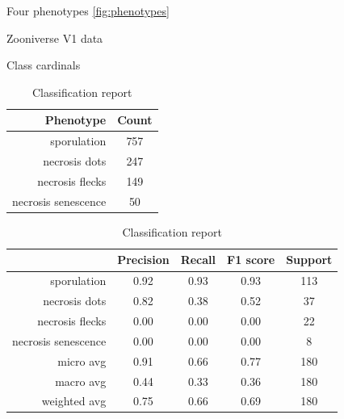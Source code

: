 \documentclass[english]{article}
\begin{document}
Four phenotypes \ref*{fig:phenotypes}

\begin{table}[H]
	\caption{Zooniverse V1 data}\label{tab:zv1data}
	\begin{minipage}{0.4\linewidth}
		\caption{Class cardinals}\label{tab:zoonv1classcardinals}
		\begin{tabular}{rc}
			\toprule
			Phenotype           & Count \\
			\midrule
			sporulation         & 757   \\
			necrosis dots       & 247   \\
			necrosis flecks     & 149   \\
			necrosis senescence & 50    \\
			\bottomrule
		\end{tabular}
	\end{minipage}%
	\begin{minipage}{0.4\linewidth}
		\centering
		\caption{Classification report}\label{tab:zv1mcr}
		\begin{tabular}{rcccc}
			\toprule
			{}                                    & Precision & Recall & F1 score & Support \\
			\midrule
			sporulation                           & 0.92      & 0.93   & 0.93     & 113     \\
			necrosis dots                         & 0.82      & 0.38   & 0.52     & 37      \\
			\rowcolor{red!25} necrosis flecks     & 0.00      & 0.00   & 0.00     & 22      \\
			\rowcolor{red!25} necrosis senescence & 0.00      & 0.00   & 0.00     & 8       \\
			micro avg                             & 0.91      & 0.66   & 0.77     & 180     \\
			macro avg                             & 0.44      & 0.33   & 0.36     & 180     \\
			weighted avg                          & 0.75      & 0.66   & 0.69     & 180     \\
			\bottomrule
		\end{tabular}
	\end{minipage}
\end{table}
\end{document}
